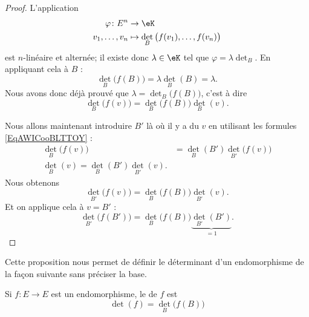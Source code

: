 \begin{proof}
    L'application
    \begin{equation}
        \begin{aligned}
            \varphi\colon E^n&\to \eK \\
            v_1,\ldots, v_n&\mapsto \det_B\big( f(v_1),\ldots, f(v_n) \big) 
        \end{aligned}
    \end{equation}
    est \( n\)-linéaire et alternée; il existe donc \( \lambda\in \eK\) tel que \( \varphi=\lambda\det_B\). En appliquant cela à \( B\) :
    \begin{equation}
        \det_B\big( f(B) \big)=\lambda \det_B(B)=\lambda.
    \end{equation}
    Nous avons donc déjà prouvé que \( \lambda=\det_B\big( f(B) \big)\), c'est à dire
    \begin{equation}
        \det_B\big( f(v) \big)=\det_B\big( f(B) \big)\det_B(v).
    \end{equation}
    
    Nous allons maintenant introduire \( B'\) là où il y a du \( v\) en utilisant les formules \eqref{EqAWICooBLTTOY} :
    \begin{subequations}
        \begin{align}
            \det_B\big( f(v) \big)&=\det_B(B')\det_{B'}\big( f(v) \big)\\
            \det_B(v)=\det_B(B')\det_{B'}(v).
        \end{align}
    \end{subequations}
    Nous obtenons
    \begin{equation}
        \det_{B'}\big( f(v) \big)=\det_B\big( f(B) \big)\det_{B'}(v).
    \end{equation}
    Et on applique cela à \( v=B'\) :
    \begin{equation}
        \det_{B'}\big( f(B') \big)=\det_B\big( f(B) \big)\underbrace{\det_{B'}(B')}_{=1}.
    \end{equation}
\end{proof}

Cette proposition nous permet de définir le déterminant d'un endomorphisme de la façon suivante sans préciser la base.
\begin{definition}        \label{DefCOZEooGhRfxA}
    Si \( f\colon E\to E\) est un endomorphisme, le  de \( f\) est
    \begin{equation}
        \det(f)=\det_B\big( f(B) \big)
    \end{equation}
\end{definition}

